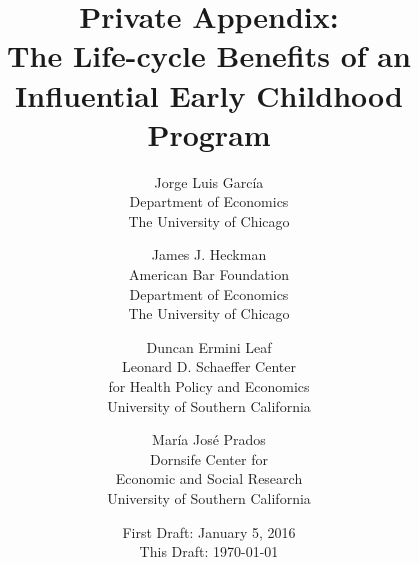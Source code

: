 




\renewcommand\theassumption{AA--\arabic{assumption}}


\title{\Large \textbf{Private Appendix: \\ The Life-cycle Benefits of an Influential Early Childhood Program}}

\author{
Jorge Luis Garc\'{i}a\\
Department of Economics\\
The University of Chicago \and
James J. Heckman \\
American Bar Foundation \\
Department of Economics\\
The University of Chicago \and
Duncan Ermini Leaf \\
Leonard D. Schaeffer Center \\  for Health Policy and Economics\\
University of Southern California \and
Mar\'{i}a Jos\'{e} Prados \\
Dornsife Center for \\ Economic and Social Research\\
University of Southern California}
\date{First Draft: January 5, 2016\\ This Draft: \today}

\maketitle
\thispagestyle{empty}


\tableofcontents
\listoffigures
\listoftables
\doublespacing

\begin{appendices}

\renewcommand{\thesection}{L}
\setcounter{figure}{0}  \renewcommand{\thefigure}{L.\arabic{figure}}
\setcounter{table}{0}   \renewcommand{\thetable}{L.\arabic{table}}


\renewcommand{\thesection}{M}
\setcounter{figure}{0}  \renewcommand{\thefigure}{M.\arabic{figure}}
\setcounter{table}{0}   \renewcommand{\thetable}{M.\arabic{table}}


\renewcommand{\thesection}{N}
\setcounter{figure}{0}  \renewcommand{\thefigure}{N.\arabic{figure}}
\setcounter{table}{0}   \renewcommand{\thetable}{N.\arabic{table}}


\end{appendices}

\renewcommand{\refname}{Appendix References}
\clearpage
\singlespace




